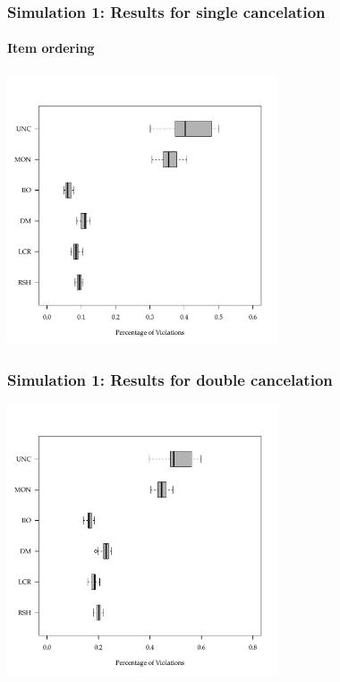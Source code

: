 \documentclass[10pt,serif,professionalfont]{beamer}
\begin{document}
\begin{frame}
    \frametitle{Simulation 1: Results for single cancelation}
        \framesubtitle{Item ordering}

    \centering \includegraphics[width=0.6\textwidth]{./figs/sc_rows.pdf}

\end{frame}

\begin{frame}
    \frametitle{Simulation 1: Results for double cancelation}

    \centering \includegraphics[width=0.6\textwidth]{./figs/sc+dc.pdf}

\end{frame}
\end{document}
